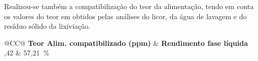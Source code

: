 Realizou-se também a compatibilização do teor da alimentação, tendo em conta os valores do teor em  obtidos pelas análises do licor, da água de lavagem e do resíduo sólido da lixiviação.

\begin{table}[!ht]
    \centering
    \begin{tabularx}{\textwidth}{@{}CC@{}}
        \toprule
        \textbf{Teor Alim. compatibilizado (ppm)} & \textbf{Rendimento fase líquida} \\ ,42 & 57,21~\% \\ \bottomrule
    \end{tabularx}
    \caption{Teor da alimentação compatibilizado (Bromo, ensaio 2).}
    \label{tab:compatibalized-grade-feed-bromo-2}
\end{table}


\hrulefill
